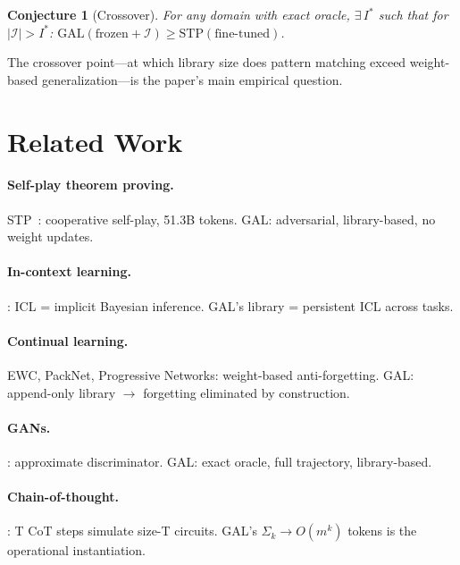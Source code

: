 \documentclass{article}
\newtheorem{conjecture}[theorem]{Conjecture}
\newcommand{\calI}{\mathcal{I}}
\begin{document}
\begin{conjecture}[Crossover]\label{conj:crossover}
For any domain with exact oracle, $\exists\, I^*$ such that
for $|\calI| > I^*$:
$\mathrm{GAL}(\text{frozen} + \calI) \geq
\mathrm{STP}(\text{fine-tuned})$.
\end{conjecture}

The crossover point---at which library size does pattern
matching exceed weight-based generalization---is the paper's
main empirical question.

\section{Related Work}\label{sec:related}

\paragraph{Self-play theorem proving.}
STP~\citep{dong2025stp}: cooperative self-play, 51.3B tokens.
GAL: adversarial, library-based, no weight updates.

\paragraph{In-context learning.}
\citet{xie2022explanation}: ICL = implicit Bayesian inference.
GAL's library = persistent ICL across tasks.

\paragraph{Continual learning.}
EWC, PackNet, Progressive Networks: weight-based anti-forgetting.
GAL: append-only library $\to$ forgetting eliminated by
construction.

\paragraph{GANs.}
\citet{arora2017generalization}: approximate discriminator.
GAL: exact oracle, full trajectory, library-based.

\paragraph{Chain-of-thought.}
\citet{li2024chain}: T CoT steps simulate size-T circuits.
GAL's $\Sigma_k \to O(m^k)$ tokens is the operational
instantiation.

\end{document}
